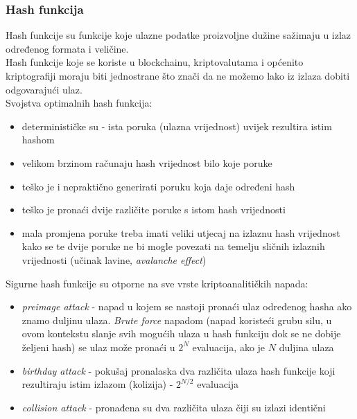 \documentclass[12pt]{article}
\begin{document}
\subsubsection{Hash funkcija}
Hash funkcije su funkcije koje ulazne podatke proizvoljne dužine sažimaju u izlaz određenog formata i veličine.\\
Hash funkcije koje se koriste u blockchainu, kriptovalutama i općenito kriptografiji moraju biti jednostrane što znači da ne možemo lako iz izlaza dobiti odgovarajući ulaz.\\
Svojstva optimalnih hash funkcija:
\begin{itemize}
	\item determinističke su - ista poruka (ulazna vrijednost) uvijek rezultira istim hashom
	\item velikom brzinom računaju hash vrijednost bilo koje poruke
	\item teško je i nepraktično generirati poruku koja daje određeni hash
	\item teško je pronaći dvije različite poruke s istom hash vrijednosti
	\item mala promjena poruke treba imati veliki utjecaj na izlaznu hash vrijednost kako se te dvije poruke ne bi mogle povezati na temelju sličnih izlaznih vrijednosti (učinak lavine, \textit{avalanche effect})\cite{ideal-hash-fun}
\end{itemize}
%
\pagebreak
Sigurne hash funkcije su otporne na sve vrste kriptoanalitičkih napada:
\begin{itemize}
	\item \textit{preimage attack} - napad u kojem se nastoji pronaći ulaz određenog hasha ako znamo duljinu ulaza. \textit{Brute force} napadom (napad koristeći grubu silu, u ovom kontekstu slanje svih mogućih ulaza u hash funkciju dok se ne dobije željeni hash) se ulaz može pronaći u $2^N$ evaluacija, ako je $N$ duljina ulaza
	\item \textit{birthday attack} - pokušaj pronalaska dva različita ulaza hash funkcije koji rezultiraju istim izlazom (kolizija) - $2^{N/2}$ evaluacija
	\item \textit{collision attack} - pronađena su dva različita ulaza čiji su izlazi identični
\end{itemize}
\end{document}
